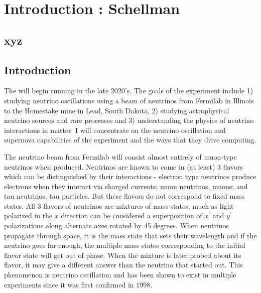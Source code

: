 \chapter{Introduction : Schellman }
\label{ch:intro}

\section{xyz}
\label{sec:intro:xyz}  %



\section{Introduction}

The   will begin running in the late 2020's.  The goals of the experiment include 1) studying neutrino oscillations using a beam of neutrinos from Fermilab in Illinois to the Homestake mine in Lead, South Dakota, 2) studying  astrophysical neutrino sources and rare processes and 3) understanding  the physics of neutrino interactions in matter.   I will concentrate on the neutrino oscillation and supernova capabilities of the experiment and the ways that they drive computing. 

The neutrino beam from Fermilab will consist almost entirely of muon-type neutrinos when produced.  Neutrinos are known to come in (at least) 3 flavors which can be distinguished by their interactions - electron type neutrinos produce electrons when they interact via charged currents; muon neutrinos, muons; and tau neutrinos, tau particles.  But these flavors do not correspond to fixed mass states.  All 3 flavors of neutrinos are mixtures of mass states, much as  light polarized in the $x$ direction  can be considered a superposition of  $x^\prime$ and $y^\prime$ polarizations along  alternate axes rotated by 45 degrees.  When neutrinos propagate through space, it is the mass state that sets their wavelength and if the neutrino goes far enough, the multiple mass states  corresponding to the initial flavor state will get out of phase.  When the mixture is later probed about its flavor, it  may give a different answer than the neutrino that started out. This phenomenon is neutrino oscillation and has been shown to exist in multiple experiments since it was first confirmed in 1998\cite{Kajita2006}.

